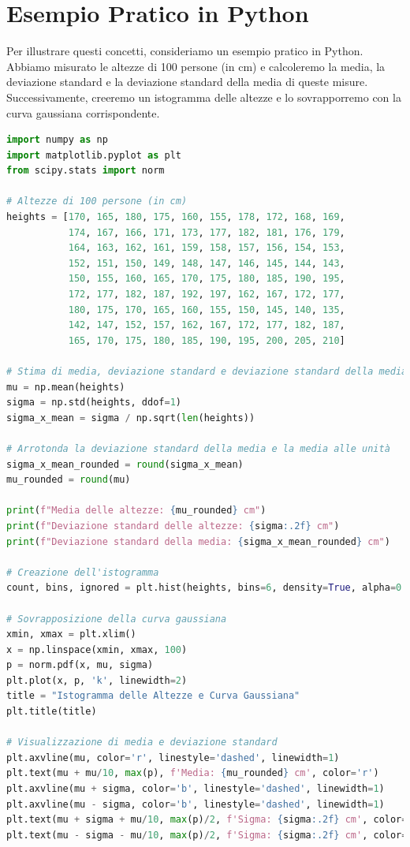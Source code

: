 \documentclass{article}
\begin{document}
\section{Esempio Pratico in Python}
Per illustrare questi concetti, consideriamo un esempio pratico in Python. Abbiamo misurato le altezze di 100 persone (in cm) e calcoleremo la media, la deviazione standard e la deviazione standard della media di queste misure. Successivamente, creeremo un istogramma delle altezze e lo sovrapporremo con la curva gaussiana corrispondente.

\begin{lstlisting}[language=Python, caption={Script Python per calcolare e visualizzare le altezze}]
import numpy as np
import matplotlib.pyplot as plt
from scipy.stats import norm

# Altezze di 100 persone (in cm)
heights = [170, 165, 180, 175, 160, 155, 178, 172, 168, 169, 
           174, 167, 166, 171, 173, 177, 182, 181, 176, 179, 
           164, 163, 162, 161, 159, 158, 157, 156, 154, 153, 
           152, 151, 150, 149, 148, 147, 146, 145, 144, 143,
           150, 155, 160, 165, 170, 175, 180, 185, 190, 195,
           172, 177, 182, 187, 192, 197, 162, 167, 172, 177,
           180, 175, 170, 165, 160, 155, 150, 145, 140, 135,
           142, 147, 152, 157, 162, 167, 172, 177, 182, 187,
           165, 170, 175, 180, 185, 190, 195, 200, 205, 210]

# Stima di media, deviazione standard e deviazione standard della media
mu = np.mean(heights)
sigma = np.std(heights, ddof=1)
sigma_x_mean = sigma / np.sqrt(len(heights))

# Arrotonda la deviazione standard della media e la media alle unità
sigma_x_mean_rounded = round(sigma_x_mean)
mu_rounded = round(mu)

print(f"Media delle altezze: {mu_rounded} cm")
print(f"Deviazione standard delle altezze: {sigma:.2f} cm")
print(f"Deviazione standard della media: {sigma_x_mean_rounded} cm")

# Creazione dell'istogramma
count, bins, ignored = plt.hist(heights, bins=6, density=True, alpha=0.6, color='g', edgecolor='black')

# Sovrapposizione della curva gaussiana
xmin, xmax = plt.xlim()
x = np.linspace(xmin, xmax, 100)
p = norm.pdf(x, mu, sigma)
plt.plot(x, p, 'k', linewidth=2)
title = "Istogramma delle Altezze e Curva Gaussiana"
plt.title(title)

# Visualizzazione di media e deviazione standard
plt.axvline(mu, color='r', linestyle='dashed', linewidth=1)
plt.text(mu + mu/10, max(p), f'Media: {mu_rounded} cm', color='r')
plt.axvline(mu + sigma, color='b', linestyle='dashed', linewidth=1)
plt.axvline(mu - sigma, color='b', linestyle='dashed', linewidth=1)
plt.text(mu + sigma + mu/10, max(p)/2, f'Sigma: {sigma:.2f} cm', color='b')
plt.text(mu - sigma - mu/10, max(p)/2, f'Sigma: {sigma:.2f} cm', color='b')


\end{lstlisting}
\end{document}
